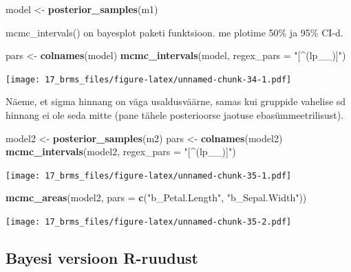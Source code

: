 \documentclass[]{book}
\newenvironment{Shaded}{\begin{snugshade}}{\end{snugshade}}
\newcommand{\DataTypeTok}[1]{\textcolor[rgb]{0.13,0.29,0.53}{#1}}
\newcommand{\KeywordTok}[1]{\textcolor[rgb]{0.13,0.29,0.53}{\textbf{#1}}}
\newcommand{\NormalTok}[1]{#1}
\newcommand{\StringTok}[1]{\textcolor[rgb]{0.31,0.60,0.02}{#1}}
\begin{document}
\begin{Shaded}
\begin{Highlighting}[]
\NormalTok{model <-}\StringTok{ }\KeywordTok{posterior_samples}\NormalTok{(m1)}
\end{Highlighting}
\end{Shaded}

mcmc\_intervals() on bayesplot paketi funktsioon. me plotime 50\% ja 95\% CI-d.

\begin{Shaded}
\begin{Highlighting}[]
\NormalTok{pars <-}\StringTok{ }\KeywordTok{colnames}\NormalTok{(model)}
\KeywordTok{mcmc_intervals}\NormalTok{(model, }\DataTypeTok{regex_pars =} \StringTok{"[^(lp__)]"}\NormalTok{)}
\end{Highlighting}
\end{Shaded}

\texttt{[image: 17\_brms\_files/figure-latex/unnamed-chunk-34-1.pdf]}

Näeme, et sigma hinnang on väga usaldusväärne, samas kui gruppide vahelise sd hinnang ei ole seda mitte (pane tähele posterioorse jaotuse ebasümmeetrilisust).

\begin{Shaded}
\begin{Highlighting}[]
\NormalTok{model2 <-}\StringTok{ }\KeywordTok{posterior_samples}\NormalTok{(m2)}
\NormalTok{pars <-}\StringTok{ }\KeywordTok{colnames}\NormalTok{(model2)}
\KeywordTok{mcmc_intervals}\NormalTok{(model2, }\DataTypeTok{regex_pars =} \StringTok{"[^(lp__)]"}\NormalTok{)}
\end{Highlighting}
\end{Shaded}

\texttt{[image: 17\_brms\_files/figure-latex/unnamed-chunk-35-1.pdf]}

\begin{Shaded}
\begin{Highlighting}[]
\KeywordTok{mcmc_areas}\NormalTok{(model2,  }\DataTypeTok{pars =} \KeywordTok{c}\NormalTok{(}\StringTok{"b_Petal.Length"}\NormalTok{, }\StringTok{"b_Sepal.Width"}\NormalTok{))}
\end{Highlighting}
\end{Shaded}

\texttt{[image: 17\_brms\_files/figure-latex/unnamed-chunk-35-2.pdf]}

\hypertarget{bayesi-versioon-r-ruudust}{%
\subsection{Bayesi versioon R-ruudust}\label{bayesi-versioon-r-ruudust}}
\end{document}
